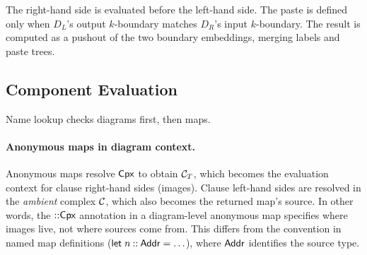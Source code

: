 \documentclass[acmsmall,screen,nonacm]{acmart}
\begin{document}
The right-hand side is evaluated before the left-hand side.
The paste is defined only when $D_L$'s output $k$-boundary
matches $D_R$'s input $k$-boundary. The result is computed as a pushout
of the two boundary embeddings, merging labels and paste trees.

\subsection{Component Evaluation}
\label{sec:diag:comp}




Name lookup checks diagrams first, then maps.

\paragraph{Anonymous maps in diagram context.}
Anonymous maps resolve $\textsf{Cpx}$ to obtain $\mathcal{C}_T$, which
becomes the evaluation context for clause right-hand sides (images).
Clause left-hand sides are resolved in the \emph{ambient} complex
$\mathcal{C}$, which also becomes the returned map's source. In other words,
the $\mathbin{::}\textsf{Cpx}$ annotation in a diagram-level anonymous map
specifies where images live, not where sources come from. This differs
from the convention in named map definitions ($\mathsf{let}\;n \mathbin{::}
\textsf{Addr} = \ldots$), where $\textsf{Addr}$ identifies the source type.
\end{document}
